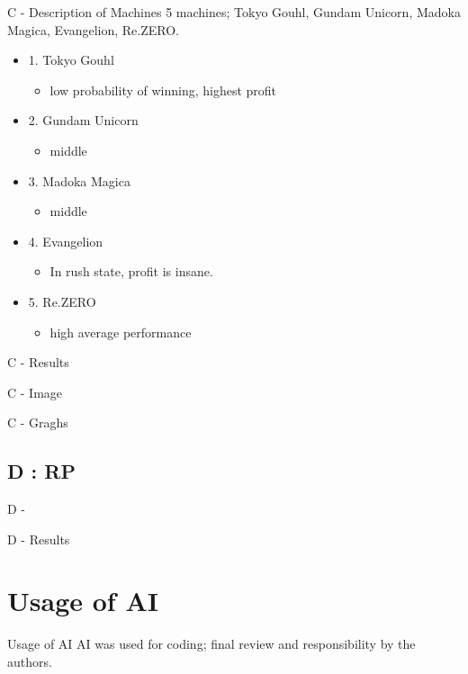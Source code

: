 \documentclass{beamer}
\begin{document}
\begin{frame}{C - Description of Machines}
5 machines; Tokyo Gouhl, Gundam Unicorn, Madoka Magica, Evangelion, Re.ZERO.
\begin{itemize}
    \item 1. Tokyo Gouhl
    \begin{itemize}
        \item low probability of winning, highest profit
    \end{itemize}
    \item 2. Gundam Unicorn
    \begin{itemize}
        \item middle
    \end{itemize}
    \item 3. Madoka Magica 
    \begin{itemize}
        \item middle
    \end{itemize}
    \item 4. Evangelion
    \begin{itemize}
        \item In rush state, profit is insane.
    \end{itemize}
    \item 5. Re.ZERO
    \begin{itemize}
        \item high average performance
    \end{itemize}
\end{itemize}
\end{frame}

\begin{frame}{C - Results}

    
\end{frame}


\begin{frame}{C - Image}
    
\end{frame}

\begin{frame}{C - Graghs}

    
\end{frame}



\subsection{D : RP}
\begin{frame}{D -}
    
\end{frame}

\begin{frame}{D - Results}

    
\end{frame}

\section{Usage of AI}
\begin{frame}{Usage of AI}
    AI was used for coding; final review and responsibility by the authors.
\end{frame}
\end{document}
